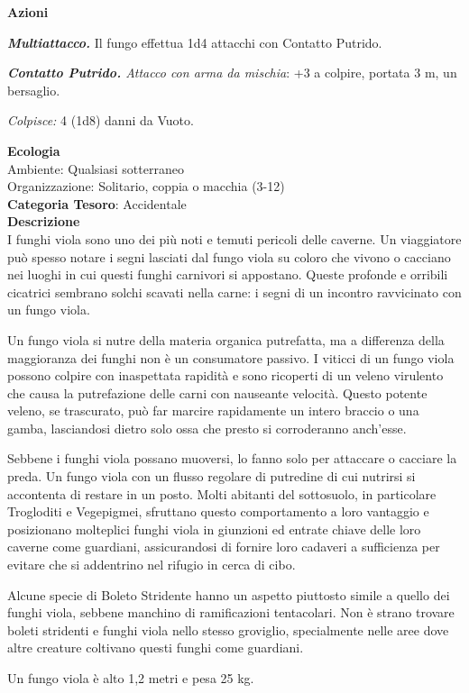 \begin{multicols}{2}
{\textbf{Azioni}

\emph{\textbf{Multiattacco.}} Il fungo effettua 1d4 attacchi con Contatto Putrido.

\emph{\textbf{Contatto Putrido.} Attacco con arma da mischia}: +3 a colpire, portata 3 m, un bersaglio.

\emph{Colpisce:} 4 (1d8) danni da Vuoto.

\textbf{Ecologia}\\
Ambiente: Qualsiasi sotterraneo\\
Organizzazione: Solitario, coppia o macchia (3-12)\\
\textbf{Categoria Tesoro}: Accidentale\\
\textbf{Descrizione}\\
I funghi viola sono uno dei più noti e temuti pericoli delle caverne. Un viaggiatore può spesso notare i segni lasciati dal fungo viola su coloro che vivono o cacciano nei luoghi in cui questi funghi carnivori si appostano. Queste profonde e orribili cicatrici sembrano solchi scavati nella carne: i segni di un incontro ravvicinato con un fungo viola.

Un fungo viola si nutre della materia organica putrefatta, ma a differenza della maggioranza dei funghi non è un consumatore passivo. I viticci di un fungo viola possono colpire con inaspettata rapidità e sono ricoperti di un veleno virulento che causa la putrefazione delle carni con nauseante velocità. Questo potente veleno, se trascurato, può far marcire rapidamente un intero braccio o una gamba, lasciandosi dietro solo ossa che presto si corroderanno anch'esse.

Sebbene i funghi viola possano muoversi, lo fanno solo per attaccare o cacciare la preda. Un fungo viola con un flusso regolare di putredine di cui nutrirsi si accontenta di restare in un posto. Molti abitanti del sottosuolo, in particolare Trogloditi e Vegepigmei, sfruttano questo comportamento a loro vantaggio e posizionano molteplici funghi viola in giunzioni ed entrate chiave delle loro caverne come guardiani, assicurandosi di fornire loro cadaveri a sufficienza per evitare che si addentrino nel rifugio in cerca di cibo.

Alcune specie di Boleto Stridente hanno un aspetto piuttosto simile a quello dei funghi viola, sebbene manchino di ramificazioni tentacolari. Non è strano trovare boleti stridenti e funghi viola nello stesso groviglio, specialmente nelle aree dove altre creature coltivano questi funghi come guardiani.

Un fungo viola è alto 1,2 metri e pesa 25 kg.

}
\end{multicols}
